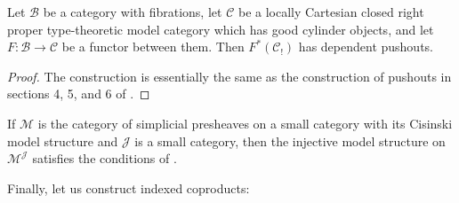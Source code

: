 \documentclass[reqno]{amsart}
\theoremstyle{definition}
\theoremstyle{remark}
\newcommand{\scat}[1]{\mathcal{#1}}
\numberwithin{figure}{section}
\begin{document}
\begin{prop}[pushouts]
Let $\scat{B}$ be a category with fibrations, let $\scat{C}$ be a locally Cartesian closed right proper type-theoretic model category which has good cylinder objects, and let $F : \scat{B} \to \scat{C}$ be a functor between them.
Then $F^*(\scat{C}_!)$ has dependent pushouts.
\end{prop}
\begin{proof}
The construction is essentially the same as the construction of pushouts in sections 4, 5, and 6 of \cite{lum-shul-hits}.
\end{proof}

\begin{example}
If $\scat{M}$ is the category of simplicial presheaves on a small category with its Cisinski model structure \cite{cisinski-presheaf,cisinski} and $\scat{J}$ is a small category,
then the injective model structure on $\scat{M}^\scat{J}$ satisfies the conditions of .
\end{example}

Finally, let us construct indexed coproducts:
\end{document}
